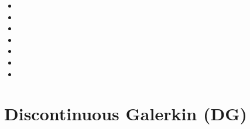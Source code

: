 \begin{scriptsize}
\begin{itemize}
\item[\nineteenninetytwo] 
\item[\nineteenninetyseven] 
\item[\twothousandthree] 
\item[\twothousandfour] 
\item[\twothousandseven] 
\item[\twothousandten] 
\item[\twothousandtwelve] 
\end{itemize}
\end{scriptsize}

\section{Discontinuous Galerkin (DG)}

